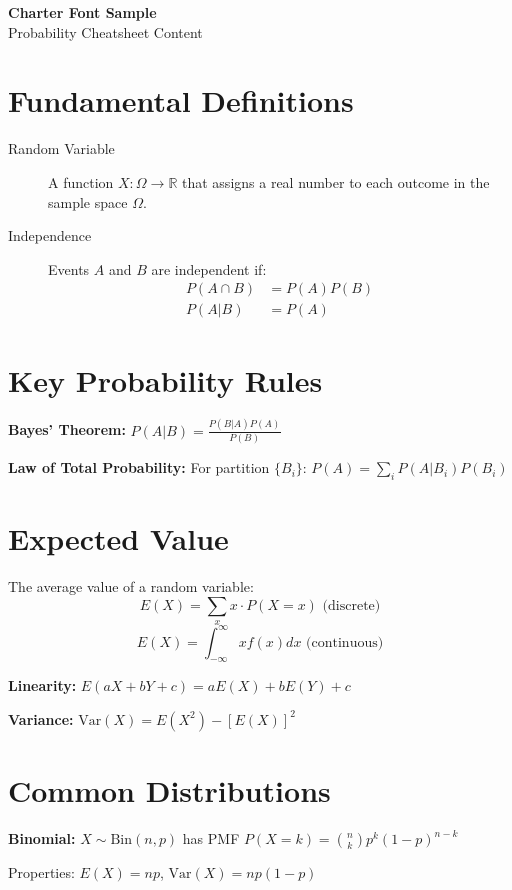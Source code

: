 \documentclass[10pt]{article}
\newcommand{\var}{\textrm{Var}}
\newcommand{\Bin}{\textrm{Bin}}
\begin{document}
\begin{center}
{\Large\bfseries Charter Font Sample}\\
{\large Probability Cheatsheet Content}
\end{center}

\vspace{0.5cm}

\section{Fundamental Definitions}
\begin{description}
    \item[Random Variable] A function $X: \Omega \to \mathbb{R}$ that assigns a real number to each outcome in the sample space $\Omega$.
    \item[Independence] Events $A$ and $B$ are independent if:
    \begin{align*}
        P(A \cap B) &= P(A)P(B) \\
        P(A|B) &= P(A)
    \end{align*}
\end{description}

\section{Key Probability Rules}
\textbf{Bayes' Theorem:} $P(A|B) = \frac{P(B|A)P(A)}{P(B)}$

\textbf{Law of Total Probability:} For partition $\{B_i\}$: $P(A) = \sum_{i} P(A|B_i)P(B_i)$

\section{Expected Value}
The average value of a random variable:
\[E(X) = \sum_{x} x \cdot P(X = x) \text{ (discrete)}\]
\[E(X) = \int_{-\infty}^{\infty} x f(x) dx \text{ (continuous)}\]

\textbf{Linearity:} $E(aX + bY + c) = aE(X) + bE(Y) + c$

\textbf{Variance:} $\var(X) = E(X^2) - [E(X)]^2$

\section{Common Distributions}
\textbf{Binomial:} $X \sim \Bin(n, p)$ has PMF $P(X = k) = \binom{n}{k} p^k (1-p)^{n-k}$

Properties: $E(X) = np$, $\var(X) = np(1-p)$
\end{document}
